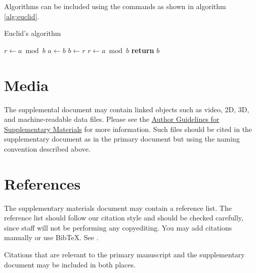 \documentclass[9pt]{osa-supplemental-document}
\begin{document}
Algorithms can be included using the commands as shown in algorithm \ref{alg:euclid}.

\begin{algorithm}
\caption{Euclid’s algorithm}\label{alg:euclid}
\begin{algorithmic}[1]
\State $r\gets a\bmod b$
\State $a\gets b$
\State $b\gets r$
\State $r\gets a\bmod b$
\EndWhile\label{euclidendwhile}
\State \textbf{return} $b$
\EndProcedure
\end{algorithmic}
\end{algorithm}

\section*{Media}

The supplemental document may contain linked objects such as video, 2D, 3D, and machine-readable data files. Please see the \href{https://opg.optica.org/submit/style/supplementary_materials.cfm}{Author Guidelines for Supplementary Materials} for more information. Such files should be cited in the supplementary document as in the primary document but using the naming convention described above.

\section*{References} 

The supplementary materials document may contain a reference list. The reference list should follow our citation style and should be checked carefully, since staff will not be performing any copyediting. You may add citations manually or use BibTeX. See \cite{Zhang:14}.

Citations that are relevant to the primary manuscript and the supplementary document may be included in both places.



\end{document}
